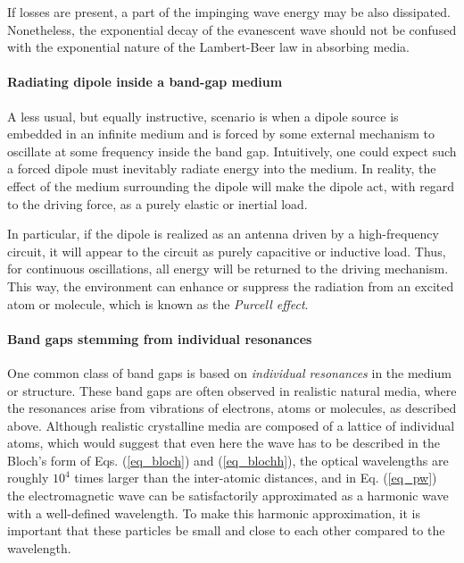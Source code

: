 If losses are present, a part of the impinging wave energy may be also dissipated. Nonetheless, the exponential decay of the evanescent wave should not be confused with the exponential nature of the Lambert-Beer law in absorbing media. 


\paragraph{Radiating dipole inside a band-gap medium} %
A less usual, but equally instructive, scenario is when a dipole source is embedded in an infinite medium and is forced by some external mechanism to oscillate at some frequency inside the band gap. Intuitively, one could expect such a forced dipole must inevitably radiate energy into the medium. In reality, the effect of the medium surrounding the dipole will make the dipole act, with regard to the driving force, as a purely elastic or inertial load. 

In particular, if the dipole is realized as an antenna driven by a high-frequency circuit, it will appear to the circuit as purely capacitive or inductive load. Thus, for continuous oscillations, all energy will be returned to the driving mechanism. This way, the environment can enhance or suppress the radiation from an excited atom or molecule, which is known as the \textit{Purcell effect}.


\paragraph{Band gaps stemming from individual resonances}%
One common class of band gaps is based on \textit{individual resonances} in the medium or structure. These band gaps are often observed in realistic natural media, where the resonances arise from vibrations of electrons, atoms or molecules, as described above. 
Although realistic crystalline media are composed of a lattice of individual atoms, which would suggest that even here the wave has to be described in the Bloch's form of Eqs. (\ref{eq_bloch}) and (\ref{eq_blochh}), the optical wavelengths are roughly $10^{4}$ times larger than the inter-atomic distances, and in Eq. (\ref{eq_pw}) the electromagnetic wave can be satisfactorily approximated as a harmonic wave with a well-defined wavelength. To make this harmonic approximation, it is important that these particles be small and close to each other compared to the wavelength. %


